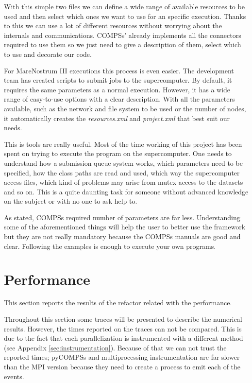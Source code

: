 With this simple two files we can define a wide range of available resources to be used and then select which ones we want to use for an specific execution. Thanks to this we can use a lot of different resources without worrying about the internals and communications. COMPSs' already implements all the connectors required to use them so we just need to give a description of them, select which to use and decorate our code. 

For MareNostrum III executions this process is even easier. The development team has created scripts to submit jobs to the supercomputer. By default, it requires the same parameters as a normal execution. However, it has a wide range of easy-to-use options with a clear description. With all the parameters available, such as the network and file system to be used or the number of nodes, it automatically creates the \textit{resources.xml} and \textit{project.xml} that best suit our needs. 

This is tools are really useful. Most of the time working of this project has been spent on trying to execute the program on the supercomputer. One needs to understand how a submission queue system works, which parameters need to be specified, how the class paths are read and used, which way the supercomputer access files, which kind of problems may arise from mutex access to the datasets and so on. This is a quite daunting task for someone without advanced knowledge on the subject or with no one to ask help to. 

As stated, COMPSs required number of parameters are far less. Understanding some of the aforementioned things will help the user to better use the framework but they are not really mandatory because the COMPSs manuals are good and clear. Following the examples is enough to execute your own programs. 



\section{Performance}

\label{sec:resperformance}

This section reports the results of the refactor related with the performance. 

Throughout this section some traces will be presented to describe the numerical results. However, the times reported on the traces can not be compared. This is due to the fact that each parallelization is instrumented with a different method (see Appendix \ref{sec:instrumentation}). Because of that we can not trust the reported times; pyCOMPSs and multiprocessing instrumentation are far slower than the MPI version because they need to create a process to emit each of the events.

